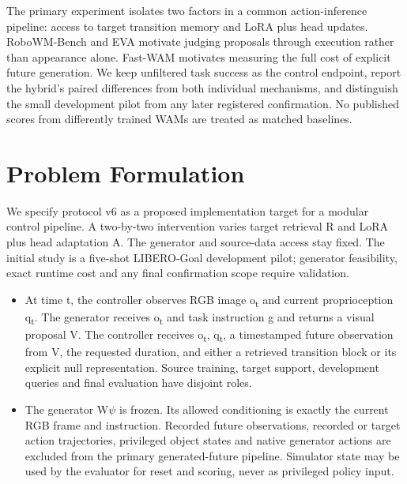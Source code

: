 \documentclass[11pt,a4paper]{article}
\begin{document}
The primary experiment isolates two factors in a common action-inference pipeline: access to target transition memory and LoRA plus head updates. RoboWM-Bench \cite{ref35} and EVA \cite{ref36} motivate judging proposals through execution rather than appearance alone. Fast-WAM \cite{ref38} motivates measuring the full cost of explicit future generation. We keep unfiltered task success as the control endpoint, report the hybrid's paired differences from both individual mechanisms, and distinguish the small development pilot from any later registered confirmation. No published scores from differently trained WAMs are treated as matched baselines.

\section{Problem Formulation}

We specify protocol v6 as a proposed implementation target for a modular control pipeline. A two-by-two intervention varies target retrieval R and LoRA plus head adaptation A. The generator and source-data access stay fixed. The initial study is a five-shot LIBERO-Goal development pilot; generator feasibility, exact runtime cost and any final confirmation scope require validation.

\begin{itemize}\item At time t, the controller observes RGB image o\textsubscript{t} and current proprioception q\textsubscript{t}. The generator receives o\textsubscript{t} and task instruction g and returns a visual proposal V. The controller receives o\textsubscript{t}, q\textsubscript{t}, a timestamped future observation from V, the requested duration, and either a retrieved transition block or its explicit null representation. Source training, target support, development queries and final evaluation have disjoint roles.\end{itemize}

\begin{itemize}\item The generator W\(\psi\) is frozen. Its allowed conditioning is exactly the current RGB frame and instruction. Recorded future observations, recorded or target action trajectories, privileged object states and native generator actions are excluded from the primary generated-future pipeline. Simulator state may be used by the evaluator for reset and scoring, never as privileged policy input.\end{itemize}
\end{document}
